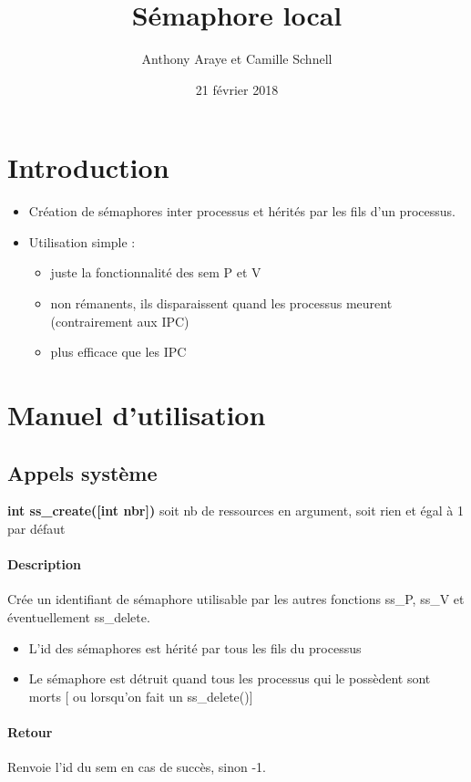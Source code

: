 \documentclass[12pt]{article}
\title{Sémaphore local}
\author{Anthony Araye et Camille Schnell}
\date{21 février 2018}
\begin{document}
\maketitle
\renewcommand{\contentsname}{Sommaire}
\tableofcontents
\newpage
\section{Introduction}
  \begin{itemize}
    \item Création de sémaphores inter processus et hérités par les fils d'un processus.
    \item Utilisation simple :
    \begin{itemize}
      \item juste la fonctionnalité des sem P et V
      \item non rémanents, ils disparaissent quand les processus meurent (contrairement aux IPC)
      \item plus efficace que les IPC
    \end{itemize}
  \end{itemize}
\newpage
\section{Manuel d'utilisation}
  \subsection{Appels système}
      \textbf{int ss\_create([int nbr])}  soit nb de ressources en argument, soit rien et égal à 1 par défaut \\
      \paragraph{Description\\}
      Crée un identifiant de sémaphore utilisable par les autres fonctions ss\_P, ss\_V et éventuellement ss\_delete. \\
      \begin{itemize}
        \item L'id des sémaphores est hérité par tous les fils du processus
        \item Le sémaphore est détruit quand tous les processus qui le possèdent sont morts [ ou lorsqu'on fait un ss\_delete()]
      \end{itemize}
      \paragraph{Retour\\}
      Renvoie l'id du sem en cas de succès, sinon -1.
\end{document}
